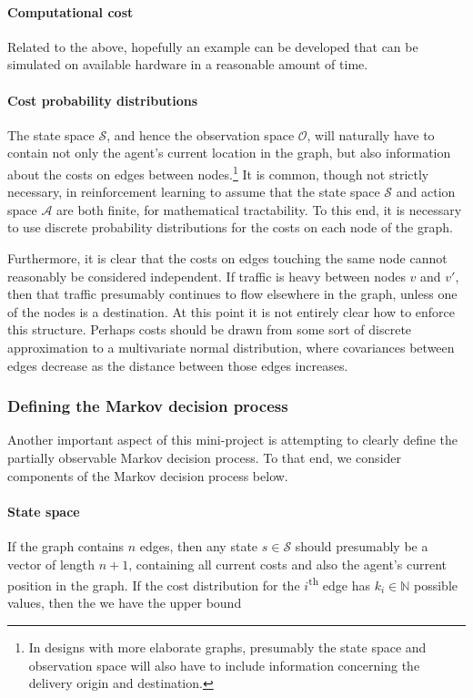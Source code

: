 \paragraph{Computational cost} Related to the above, hopefully an example can be developed that can be simulated on available hardware in a reasonable amount of time.

\paragraph{Cost probability distributions} The state space $\mathcal S$, and hence the observation space $\mathcal O$, will naturally have to contain not only the agent's current location in the graph, but also information about the costs on edges between nodes.\footnote{In designs with more elaborate graphs, presumably the state space and observation space will also have to include information concerning the delivery origin and destination.} It is common, though not strictly necessary, in reinforcement learning to assume that the state space $\mathcal S$ and action space $\mathcal A$ are both finite, for mathematical tractability. To this end, it is necessary to use discrete probability distributions for the costs on each node of the graph.

Furthermore, it is clear that the costs on edges touching the same node cannot reasonably be considered independent. If traffic is heavy between nodes $v$ and $v'$, then that traffic presumably continues to flow elsewhere in the graph, unless one of the nodes is a destination. At this point it is not entirely clear how to enforce this structure. Perhaps costs should be drawn from some sort of discrete approximation to a multivariate normal distribution, where covariances between edges decrease as the distance between those edges increases.

\subsubsection{Defining the Markov decision process}

Another important aspect of this mini-project is attempting to clearly define the partially observable Markov decision process. To that end, we consider components of the Markov decision process below.

\paragraph{State space} If the graph contains $n$ edges, then any state $s \in \mathcal S$ should presumably be a vector of length $n + 1$, containing all current costs and also the agent's current position in the graph. If the cost distribution for the $i$\textsuperscript{th} edge has $k_i \in \mathbb N$ possible values, then the we have the upper bound

